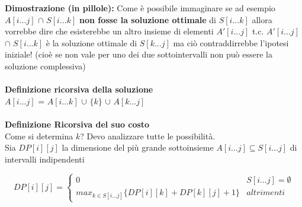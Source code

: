 \documentclass[../cheatSheetAlgoritmi.tex]{subfiles}
\begin{document}
\textbf{Dimostrazione (in pillole):} Come è possibile immaginare se ad esempio $A[i...j]$ $\cap$ $S[i...k]$ \textbf{non fosse la soluzione ottimale} di $S[i...k]$ allora vorrebbe dire che esisterebbe un altro insieme di elementi $A'[i...j]$ t.c. $A'[i...j]$ $\cap$ $S[i...k]$ è la soluzione ottimale di $S[k...j]$ ma ciò contraddirrebbe l'ipotesi iniziale! (cioè se non vale per uno dei due sottointervalli non può essere la soluzione complessiva)\\\\
\textbf{Definizione ricorsiva della soluzione}\\
$A[i...j]$ = $A[i...k]$ $\cup$ $\{k\}$ $\cup$ $A[k...j]$\\\\
\textbf{Definizione Ricorsiva del suo costo}\\
Come si determina $k$? Devo analizzare tutte le possibilità.\\
Sia $DP[i][j]$ la dimensione del più grande sottoinsieme $A[i...j] \subseteq S[i...j]$ di intervalli indipendenti
\begin{center}
	\begin{equation*}
  		DP[i][j]=\begin{cases}
    		0  & \text{$S[i...j] = \emptyset$}\\
    		max_{k \in S[i...j]}\{DP[i][k] + DP[k][j] + 1\} & \text{$altrimenti$}
  		\end{cases}
	\end{equation*}
\end{center}
\end{document}

